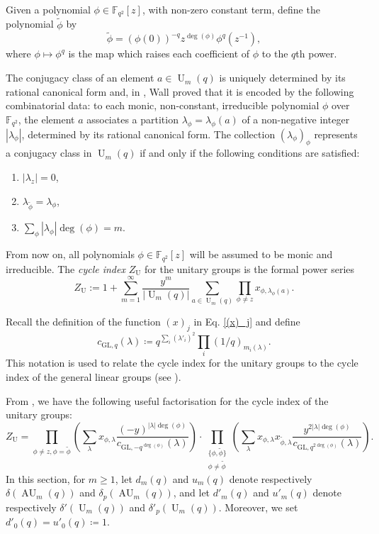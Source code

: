 \documentclass[a4paper, 12pt, oneside]{amsart}
\theoremstyle{definition}
\newcommand{\GL}{\mathrm{GL}}
\DeclareMathOperator{\AU}{AU}
\DeclareMathOperator{\U}{U}
\begin{document}
Given a polynomial $\phi \in \mathbb{F}_{q^2}[z]$, with non-zero constant term, define the polynomial $\widetilde{\phi}$ by
$$
\widetilde{\phi}=(\phi(0))^{-q}z^{\deg(\phi)}\phi^{q}(z^{-1}),
$$
where $\phi \mapsto \phi^q$ is the map which raises each coefficient of $\phi$ to the $q$th power.

The conjugacy class of an element $a \in \U_m(q)$ is uniquely determined by its rational canonical form and, in \cite{Wall}, Wall proved that it is encoded by the following combinatorial data: to each monic, non-constant, irreducible polynomial $\phi$ over $\mathbb{F}_{q^2}$, the element $a$ associates a partition $\lambda_{\phi}=\lambda_{\phi}(a)$ of a non-negative integer $|\lambda_{\phi}|$, determined by its rational canonical form. 
The collection $(\lambda_{\phi})_{\phi}$ represents a conjugacy class in $\U_m(q)$ if and only if the following conditions are satisfied:

\begin{enumerate}[label=(\roman*)]
    \item $|\lambda_z| = 0$,
    \item $\lambda_{\widetilde{\phi}}=\lambda_{\phi}$,
    \item {$\sum_{\phi} |\lambda_{\phi}| \deg(\phi)=m$}.
\end{enumerate}
From now on, all polynomials $\phi \in \mathbb{F}_{q^2}[z]$ will be assumed to be monic and irreducible.
The \textit{cycle index} $Z_{\U}$ for the unitary groups is the formal power series
$$Z_{\U} := 1 + \sum_{m=1}^{\infty} \frac{y^m}{|\U_m(q)|}\sum_{a \in \U_m(q)} \prod_{\phi \neq z}x_{\phi, \lambda_{\phi}(a)}. $$

Recall the definition of the function $(x)_j$ in Eq. \eqref{(x)_j} and define
\begin{equation*}
c_{\GL,q}(\lambda)\coloneqq q^{ \sum_{i}(\lambda'_i)^2}\prod_i(1/q)_{m_i(\lambda)}.
\end{equation*}
This notation is used to relate the cycle index for the unitary groups to the cycle index of the general linear groups (see \cite{Fulman_cycle_index}).

From \cite[Theorem 10]{Fulman_cycle_index}, we have the following useful factorisation for the cycle index of the unitary groups:
\begin{equation}
\label{fact_Z_u}
Z_{\U}= \prod_{\phi \neq z, \phi=\widetilde{\phi}} \left( \sum_{\lambda}x_{\phi,\lambda}\frac{(-y)^{|\lambda|\deg(\phi)}}{c_{\GL,-q^{\deg(\phi)}}(\lambda)}\right)\cdot \prod_{\substack{\{\phi, \widetilde{\phi}\} \\ \phi \neq \widetilde{\phi}}} \left( \sum_{\lambda}x_{\phi,\lambda}x_{\widetilde{\phi},\lambda}\frac{y^{2|\lambda|\deg(\phi)}}{c_{\GL,q^{2\deg(\phi)}}(\lambda)}\right). 
\end{equation}
In this section, for $m \ge 1$, let $d_m(q)$ and $u_m(q)$ denote respectively $\delta(\AU_m(q))$ and $\delta_p(\AU_m(q))$, and let $d'_m(q)$ and $u'_m(q)$ denote respectively $\delta'(\U_m(q))$ and $\delta'_p(\U_m(q))$. Moreover, we set $d'_0(q)=u'_0(q)\coloneqq 1$.
\end{document}
